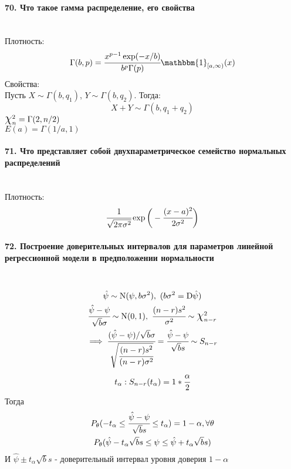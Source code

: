 \documentclass[titlepage]{article}
\newcommand{\sN}{\mathrm{N}} %
\newcommand*{\bigchi}{\mbox{\Large$\chi$}} %
\begin{document}
\paragraph{70. Что такое гамма распределение, его свойства} ~\\
Плотность:
\[\Gamma(b,p) = \cfrac{x^{p-1}\exp(-x/b)}{b^p\Gamma(p)}\mathbbm{1}_{[a,\infty)}(x)\]
Свойства:\\
Пусть $X \sim \Gamma(b,q_1)$, $Y \sim \Gamma(b,q_2)$. Тогда:
\[X + Y \sim \Gamma(b,q_1+q_2)\]
$\bigchi_n^2 = \Gamma(2,n/2)$\\
$E(a) = \Gamma(1/a,1)$

\paragraph{71. Что представляет собой двухпараметрическое семейство нормальных распределений} ~\\
Плотность:\\
\[\cfrac{1}{\sqrt{2\pi\sigma^2}}\exp\bigg(-\cfrac{(x-a)^2}{2\sigma^2}\bigg)\]


\paragraph{72. Построение доверительных интервалов для параметров линейной регрессионной модели в предположении нормальности} ~\\
\begin{gather*}
	\hat\psi \sim \sN(\psi,b\sigma^2),\ (b\sigma^2=\mathrm{D}\hat\psi)\\
	\cfrac{\hat\psi-\psi}{\sqrt{b}\sigma}\sim\sN(0,1),\ \cfrac{(n-r)s^2}{\sigma^2}\sim\bigchi_{n-r}^2\\
	\implies \cfrac{(\hat\psi-\psi)/\sqrt{b}\sigma}{\sqrt{\cfrac{(n-r)s^2}{(n-r)\sigma^2}}} = \cfrac{\hat\psi-\psi}{\sqrt{b}s} \sim S_{n-r}\\
	t_\alpha:S_{n-r}(t_\alpha) = 1 * \cfrac{\alpha}{2}
\end{gather*}
Тогда
\begin{gather*}
	P_\theta(-t_\alpha \leq \cfrac{\hat\psi-\psi}{\sqrt{b}s} \leq t_\alpha) = 1 - \alpha, \forall \theta\\
	P_\theta(\hat\psi - t_\alpha\sqrt{b}s \leq \psi \leq \hat\psi + t_\alpha\sqrt{b}s)\\
\end{gather*}
И $\hat\psi \pm t_\alpha\sqrt{b}s$ - доверительный интервал уровня доверия $1 - \alpha$
\end{document}
